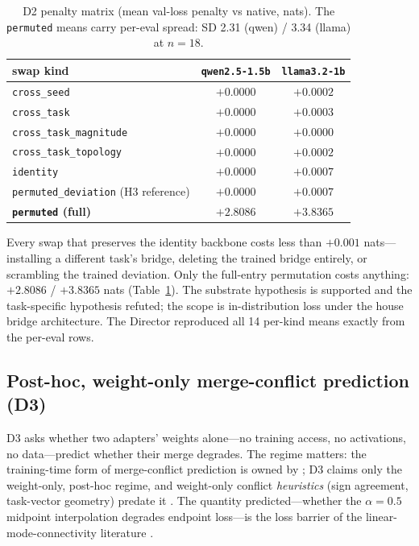 \documentclass{article}
\begin{document}
\begin{table}[ht]
\centering
\caption{D2 penalty matrix (mean val-loss penalty vs native, nats). The
\texttt{permuted} means carry per-eval spread: SD 2.31 (qwen) / 3.34
(llama) at $n = 18$.}
\label{tab:d2}
\begin{tabular}{lcc}
\toprule
swap kind & \texttt{qwen2.5-1.5b} & \texttt{llama3.2-1b} \\
\midrule
\texttt{cross\_seed} & $+0.0000$ & $+0.0002$ \\
\texttt{cross\_task} & $+0.0000$ & $+0.0003$ \\
\texttt{cross\_task\_magnitude} & $+0.0000$ & $+0.0000$ \\
\texttt{cross\_task\_topology} & $+0.0000$ & $+0.0002$ \\
\texttt{identity} & $+0.0000$ & $+0.0007$ \\
\texttt{permuted\_deviation} (H3 reference) & $+0.0000$ & $+0.0007$ \\
\textbf{\texttt{permuted} (full)} & $\mathbf{+2.8086}$ & $\mathbf{+3.8365}$ \\
\bottomrule
\end{tabular}
\end{table}

Every swap that preserves the identity backbone costs less than $+0.001$
nats---installing a different task's bridge, deleting the trained bridge
entirely, or scrambling the trained deviation. Only the full-entry
permutation costs anything: $+2.8086$ / $+3.8365$ nats
(Table~\ref{tab:d2}). The substrate hypothesis is supported and the
task-specific hypothesis refuted; the scope is in-distribution loss under
the house bridge architecture. The Director reproduced all 14 per-kind
means exactly from the per-eval rows.

\subsection{Post-hoc, weight-only merge-conflict prediction (D3)}
\label{sec:d3}

D3 asks whether two adapters' weights alone---no training access, no
activations, no data---predict whether their merge degrades. The regime
matters: the training-time form of merge-conflict prediction is owned by
\cite{mergeprobe2026}; D3 claims only the weight-only, post-hoc regime, and
weight-only conflict \emph{heuristics} (sign agreement, task-vector
geometry) predate it \cite{yadav2023ties,ilharco2023task}. The quantity
predicted---whether the $\alpha = 0.5$ midpoint interpolation degrades
endpoint loss---is the loss barrier of the linear-mode-connectivity
literature \cite{frankle2020lmc,ainsworth2023rebasin}.
\end{document}
